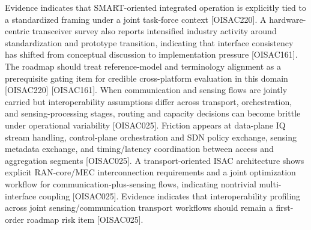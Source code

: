 {} Evidence indicates that SMART-oriented integrated operation is explicitly tied to a standardized framing under a joint task-force context [O\markdownRendererUnderscore{}ISAC\markdownRendererUnderscore{}220]. A hardware-centric transceiver survey also reports intensified industry activity around standardization and prototype transition, indicating that interface consistency has shifted from conceptual discussion to implementation pressure [O\markdownRendererUnderscore{}ISAC\markdownRendererUnderscore{}161].\markdownRendererParagraphSeparator
{} The roadmap should treat reference-model and terminology alignment as a prerequisite gating item for credible cross-platform evaluation in this domain [O\markdownRendererUnderscore{}ISAC\markdownRendererUnderscore{}220] [O\markdownRendererUnderscore{}ISAC\markdownRendererUnderscore{}161].\markdownRendererInterblockSeparator
{}
\markdownRendererSectionEnd \markdownRendererSectionBegin
{}\markdownRendererInterblockSeparator
{} When communication and sensing flows are jointly carried but interoperability assumptions differ across transport, orchestration, and sensing-processing stages, routing and capacity decisions can become brittle under operational variability [O\markdownRendererUnderscore{}ISAC\markdownRendererUnderscore{}025].\markdownRendererParagraphSeparator
{} Friction appears at data-plane IQ stream handling, control-plane orchestration and SDN policy exchange, sensing metadata exchange, and timing/latency coordination between access and aggregation segments [O\markdownRendererUnderscore{}ISAC\markdownRendererUnderscore{}025].\markdownRendererParagraphSeparator
{} A transport-oriented ISAC architecture shows explicit RAN-core/MEC interconnection requirements and a joint optimization workflow for communication-plus-sensing flows, indicating nontrivial multi-interface coupling [O\markdownRendererUnderscore{}ISAC\markdownRendererUnderscore{}025].\markdownRendererParagraphSeparator
{} Evidence indicates that interoperability profiling across joint sensing/communication transport workflows should remain a first-order roadmap risk item [O\markdownRendererUnderscore{}ISAC\markdownRendererUnderscore{}025].\markdownRendererInterblockSeparator
